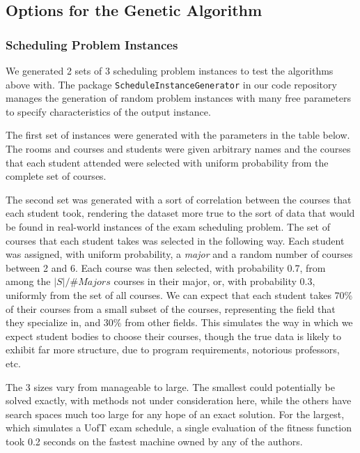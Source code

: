 \documentclass[letterpaper]{article}
\begin{document}
  \subsection{Options for the Genetic Algorithm}
    \subsubsection{Scheduling Problem Instances}
      We generated 2 sets of 3 scheduling problem instances to test the algorithms above with. 
      The package \texttt{ScheduleInstanceGenerator} in our code repository manages the generation of 
      random problem instances with many free parameters to specify characteristics of the 
      output instance.
      
      The first set of instances were generated with the parameters in the table below. 
      The rooms and courses and students were given arbitrary names and the courses that each 
      student attended were selected with uniform probability from the complete set of courses.
      
      The second set was generated with a sort of correlation between the courses that each student 
      took, rendering the dataset more true to the sort of data that would be found in real-world 
      instances of the exam scheduling problem. The set of courses that each student takes was 
      selected in the following way. Each student was assigned, with uniform probability, a \emph{major} 
      and a random number of courses between 2 and 6. Each course was then selected, with probability 
      0.7, from among the $|S|/\#Majors$ courses in their major, or, with probability 0.3, uniformly from 
      the set of all courses. We can expect that each student takes 70\% of their courses from a small 
      subset of the courses, representing the field that they specialize in, and 30\% from other fields. 
      This simulates the way in which we expect student bodies to choose their courses, though the true 
      data is likely to exhibit far more structure, due to program requirements, notorious professors, etc.
      
      The 3 sizes vary from manageable to large. The smallest could potentially be solved exactly, 
      with methods not under consideration here, while the others have search spaces much too large 
      for any hope of an exact solution. For the largest, which simulates a UofT exam schedule, a 
      single evaluation of the fitness function took 0.2 seconds on the fastest machine owned by any 
      of the authors.
      
\end{document}
